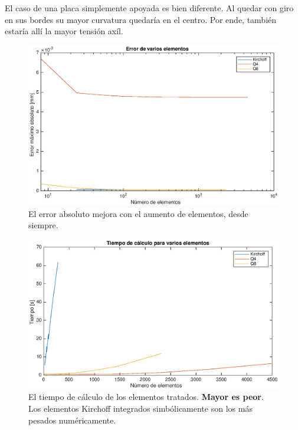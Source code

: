 \documentclass[onecolumn,10pt,titlepage]{article}
\begin{document}
El caso de una placa simplemente apoyada es bien diferente. Al quedar con giro en sus bordes su mayor curvatura quedaría en el centro. Por ende, también estaría allí la mayor tensión axíl.

\begin{figure}[htb!]
	\centering
	\includegraphics[width=.9\textwidth]{fig/errvec.eps}
	\caption{El error absoluto mejora con el aumento de elementos, desde siempre.}\label{fig:errorplacas}
\end{figure}

\begin{figure}[htb!]
	\centering
	\includegraphics[width=.9\textwidth]{fig/time.eps}
	\caption{El tiempo de cálculo de los elementos tratados. \textbf{Mayor es peor}. Los elementos Kirchoff integrados simbólicamente son los más pesados numéricamente.}
	\label{fig:timeplacas}
\end{figure}
\end{document}
